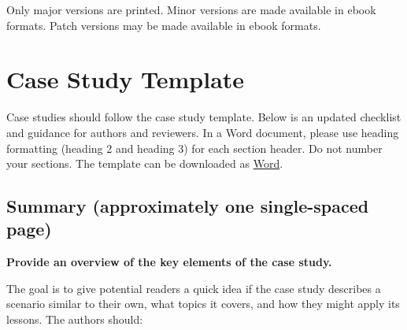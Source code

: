 \documentclass[
]{book}
\begin{document}
Only major versions are printed. Minor versions are made available in ebook formats. Patch versions may be made available in ebook formats.

\hypertarget{case-study-template}{%
\section*{Case Study Template}\label{case-study-template}}

Case studies should follow the case study template. Below is an updated checklist and guidance for authors and reviewers. In a Word document, please use heading formatting (heading 2 and heading 3) for each section header. Do not number your sections. The template can be downloaded as \href{assets/contributing/case_study_template.docx}{Word}.

\hypertarget{summary-approximately-one-single-spaced-page}{%
\subsection*{Summary (approximately one single-spaced page)}\label{summary-approximately-one-single-spaced-page}}

\textbf{Provide an overview of the key elements of the case study.}

The goal is to give potential readers a quick idea if the case study describes a scenario similar to their own, what topics it covers, and how they might apply its lessons. The authors should:
\end{document}
